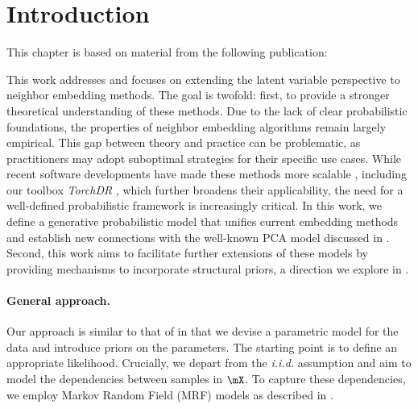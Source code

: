 \section{Introduction}\label{intro}


This chapter is based on material from the following publication:

\begin{mdframed}
\begin{center} 
\end{center}
\end{mdframed}


This work addresses  and focuses on extending the latent variable perspective to neighbor embedding methods. The goal is twofold: first, to provide a stronger theoretical understanding of these methods. Due to the lack of clear probabilistic foundations, the properties of neighbor embedding algorithms remain largely empirical. This gap between theory and practice can be problematic, as practitioners may adopt suboptimal strategies for their specific use cases.  
While recent software developments have made these methods more scalable \citep{chan2018t,pezzotti2019gpgpu,linderman2019fast}, including our toolbox \emph{TorchDR} \citep{vanassel2024torchdr}, which further broadens their applicability, the need for a well-defined probabilistic framework is increasingly critical.  
In this work, we define a generative probabilistic model that unifies current embedding methods and establish new connections with the well-known PCA model discussed in .  
Second, this work aims to facilitate further extensions of these models by providing mechanisms to incorporate structural priors, a direction we explore in .

\paragraph{General approach.}
Our approach is similar to that of  in that we devise a parametric model for the data and introduce priors on the parameters. The starting point is to define an appropriate likelihood. Crucially, we depart from the \textit{i.i.d.} assumption and aim to model the dependencies between samples in $\mX$. To capture these dependencies, we employ Markov Random Field (MRF) models as described in .

